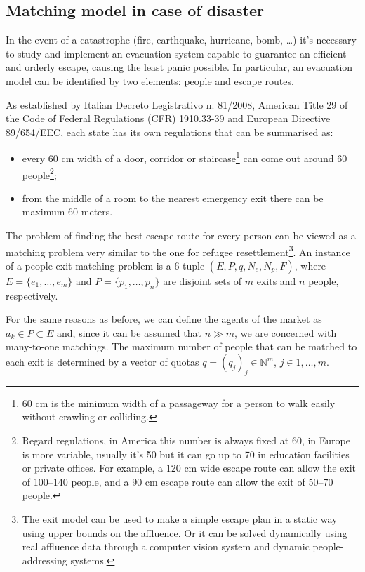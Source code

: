 \subsection{Matching model in case of disaster}\label{matching-model-in-case-of-disaster}%


In the event of a catastrophe (fire, earthquake, hurricane, bomb, \ldots) it's necessary to study and implement an evacuation system capable to guarantee an efficient and orderly escape, causing the least panic possible. In particular, an evacuation model can be identified by two elements: people and escape routes.

\nocite{it-81-2008,usa-1910-1974,cee-654-1989}%
As established by Italian Decreto Legistrativo n. 81/2008, American Title 29 of the Code of Federal Regulations (CFR)
1910.33-39 and European Directive 89/654/EEC, each state has its own regulations that can be summarised as:
\begin{itemize}
    \item every 60 cm width of a door, corridor or staircase\footnote{60 cm is the minimum width of a passageway for a person to walk easily without crawling or colliding.} can come out around 60 people\footnote{Regard regulations, in America this number is always fixed at 60, in Europe is more variable, usually it's 50 but it can go up to 70 in education facilities or private offices. For example, a 120 cm wide escape route can allow the exit of 100--140 people, and a 90 cm escape route can allow the exit of 50--70 people.};
    \item from the middle of a room to the nearest emergency exit there can be maximum 60 meters.
\end{itemize}

The problem of finding the best escape route for every person can be viewed as a matching problem very similar to the one for refugee resettlement\footnote{The exit model can be used to make a simple escape plan in a static way using upper bounds on the affluence.
Or it can be solved dynamically using real affluence data through a computer vision system and dynamic people-addressing systems.}. An instance of a people-exit matching problem is a 6-tuple \((E, P, q, N_e, N_p, F)\), where \(E = \{e_1, \dots, e_m\}\) and \(P = \{p_1, \dots, p_n\}\) are disjoint sets of \(m\) exits and \(n\) people, respectively.

For the same reasons as before, we can define the agents of the market as \(a_k \in P \subset E\) and, since it can be assumed that \(n \gg m\), we are concerned with many-to-one matchings. The maximum number of people that can be matched to each exit is determined by a vector of quotas \(q = (q_j)_j \in \mathbb{N}^m\), \(j\in {1,\ldots,m}\).

